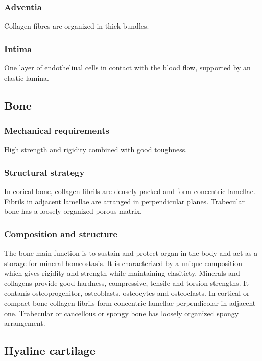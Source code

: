 		\subsubsection{Adventia}
		Collagen fibres are organized in thick bundles.

		\subsubsection{Intima}
		One layer of endotheliual cells in contact with the blood flow, supported by an elastic lamina.

	\subsection{Bone}

		\subsubsection{Mechanical requirements}
		High strength and rigidity combined with good toughness.

		\subsubsection{Structural strategy}
		In corical bone, collagen fibrils are densely packed and form concentric lamellae.
		Fibrils in adjacent lamellae are arranged in perpendicular planes.
		Trabecular bone has a loosely organized porous matrix.

		\subsubsection{Composition and structure}
		The bone main function is to sustain and protect organ in the body and act as a storage for mineral homeostasis.
		It is characterized by a unique composition which gives rigidity and strength while maintaining elasiticty.
		Minerals and collagens provide good hardness, compressive, tensile and torsion strengths.
		It contanis osteoprogenitor, osteoblasts, osteocytes and osteoclasts.
		In cortical or compact bone collagen fibrils form concentric lamellae perpendicolar in adjacent one.
		Trabecular or cancellous or spongy bone has loosely organized spongy arrangement.

	\subsection{Hyaline cartilage}

